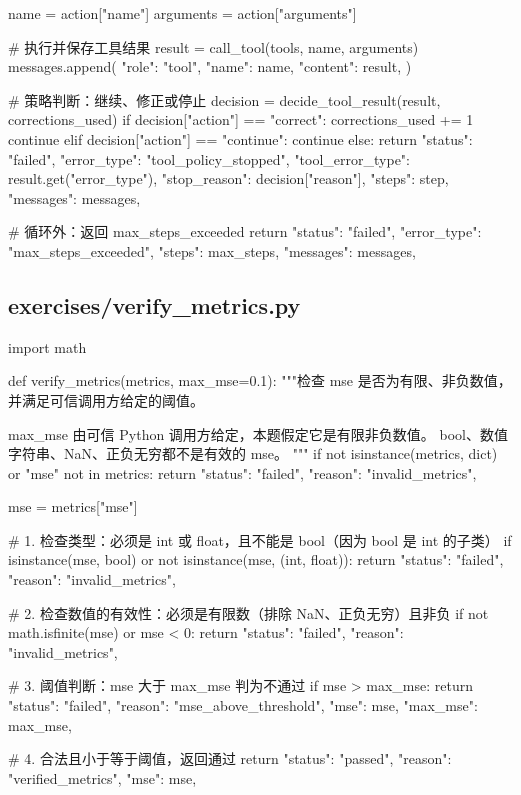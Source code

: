 \begin{Code}
        name = action["name"]
        arguments = action["arguments"]

        # 执行并保存工具结果
        result = call_tool(tools, name, arguments)
        messages.append({
            "role": "tool",
            "name": name,
            "content": result,
        })

        # 策略判断：继续、修正或停止
        decision = decide_tool_result(result, corrections_used)
        if decision["action"] == "correct":
            corrections_used += 1
            continue
        elif decision["action"] == "continue":
            continue
        else:
            return {
                "status": "failed",
                "error_type": "tool_policy_stopped",
                "tool_error_type": result.get("error_type"),
                "stop_reason": decision["reason"],
                "steps": step,
                "messages": messages,
            }

    # 循环外：返回 max_steps_exceeded
    return {
        "status": "failed",
        "error_type": "max_steps_exceeded",
        "steps": max_steps,
        "messages": messages,
    }
\end{Code}

\subsection{exercises/verify\_metrics.py}

\begin{Code}
import math


def verify_metrics(metrics, max_mse=0.1):
    """检查 mse 是否为有限、非负数值，并满足可信调用方给定的阈值。

    max_mse 由可信 Python 调用方给定，本题假定它是有限非负数值。
    bool、数值字符串、NaN、正负无穷都不是有效的 mse。
    """
    if not isinstance(metrics, dict) or "mse" not in metrics:
        return {
            "status": "failed",
            "reason": "invalid_metrics",
        }

    mse = metrics["mse"]
    
    # 1. 检查类型：必须是 int 或 float，且不能是 bool（因为 bool 是 int 的子类）
    if isinstance(mse, bool) or not isinstance(mse, (int, float)):
        return {
            "status": "failed",
            "reason": "invalid_metrics",
        }
    
    # 2. 检查数值的有效性：必须是有限数（排除 NaN、正负无穷）且非负
    if not math.isfinite(mse) or mse < 0:
        return {
            "status": "failed",
            "reason": "invalid_metrics",
        }
    
    # 3. 阈值判断：mse 大于 max_mse 判为不通过
    if mse > max_mse:
        return {
            "status": "failed",
            "reason": "mse_above_threshold",
            "mse": mse,
            "max_mse": max_mse,
        }
    
    # 4. 合法且小于等于阈值，返回通过
    return {
        "status": "passed",
        "reason": "verified_metrics",
        "mse": mse,
    }
\end{Code}

